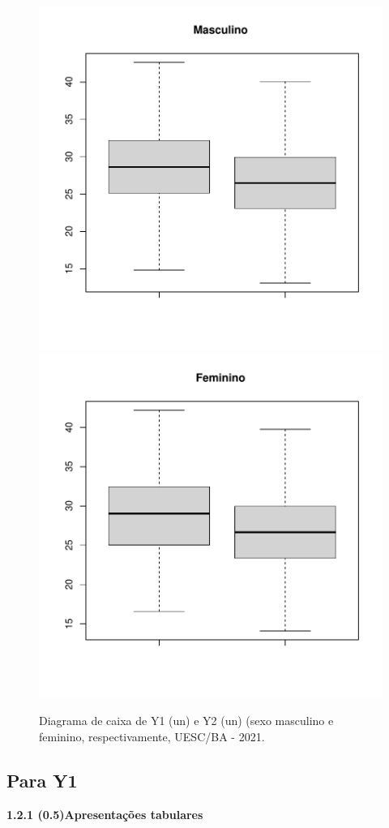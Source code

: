 \documentclass[12pt]{article}\usepackage[]{graphicx}\usepackage[]{color}
\newenvironment{knitrout}{}{} %
\begin{document}
\begin{figure}[!h]
\label{figura:boxplot-no-out}
\begin{knitrout}
\color{fgcolor}

{\centering \includegraphics[width=.4\linewidth]{figure/minimal-boxplot-depois-1} 
\includegraphics[width=.4\linewidth]{figure/minimal-boxplot-depois-2} 

}


\end{knitrout}
\caption{Diagrama de caixa de Y1 (un) e Y2 (un) (sexo masculino e feminino, respectivamente, UESC/BA - 2021.}
\end{figure}
\pagebreak

\subsection{Para Y1}

\textbf{1.2.1 (0.5)Apresentações tabulares }    
\end{document}
